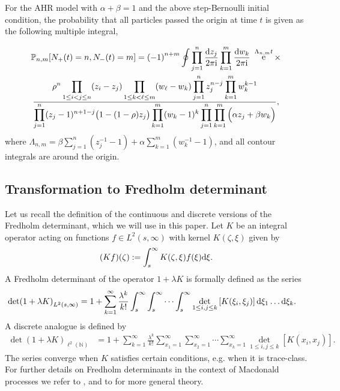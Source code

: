 \documentclass[cmp]{svjour}
\numberwithin{theorem}{section}
\numberwithin{equation}{section}
\DeclareMathOperator{\e}{e}
\def\dd{{\rm d}}
\def\ii{{\rm i}}
\begin{document}
\begin{theorem}
\label{prop:P1rho}
For the AHR model with $\alpha+\beta=1$ and the above step-Bernoulli initial condition, the probability that all particles passed the origin at time $t$ is given as the following multiple integral,

\begin{multline}
 \mathbb{P}_{n,m}[N_+(t)=n, N_-(t)=m] ={(-1)}^{n+m} 
 \oint \prod_{j=1}^n \frac{\dd z_j }{2\pi \ii} \prod_{k=1}^m
\frac{\dd w_k }{2\pi \ii}\ \e^{\Lambda_{n,m} t} \times \\
\frac{\displaystyle \rho^n \prod_{1\le i<j\le n} (z_i-z_j) \prod_{1\le k< \ell \le m} (w_\ell -w_k) \prod_{j=1}^n z_j^{n-j} \prod_{k=1}^m w_k^{k-1}}
{\displaystyle \prod_{j=1}^n (z_j-1)^{n+1-j} \big(1-(1-\rho) z_j\big)
\prod_{k=1}^m (w_k-1)^{k} \prod_{j=1}^n \prod_{k=1}^m \Big(\alpha z_j + \beta w_k\Big)},
\label{Prho1}
\end{multline}
where $\Lambda_{n,m}=\beta \sum_{j=1}^n (z_j^{-1}-1) + \alpha \sum_{k=1}^m (w_k^{-1}-1)$, and all contour integrals are around the origin.
\end{theorem}

\subsection{Transformation to Fredholm determinant}

Let us recall the definition of the continuous and discrete versions of the Fredholm determinant, which we will use in this paper. Let $K$ be an integral operator acting on functions $f \in L^2(s,\infty)$ with kernel $K(\zeta,\xi)$ given by 
$$
(Kf)(\zeta) := \int_{s}^\infty K(\zeta,\xi) f(\xi) \dd \xi.
$$
A Fredholm determinant of the operator $1+\lambda K$ is formally defined as the series 
\begin{align} 
\det(1+\lambda K)_{L^2(s,\infty)} &=  1 + \sum_{k=1}^{\infty}{ \frac{\lambda^k}{k!} } \int_{s}^{\infty}{ \int_{s}^{\infty}{ \cdots \int_{s}^{\infty}{ \det_{1 \leq i , j \leq k}\left[ K(\xi_i, \xi_j) \right] \dd \xi_1 \ldots \dd \xi_k } } }. \label{eq:FHCdef}
\end{align}
A discrete analogue is defined by
\begin{align}
\det(1+\lambda K)_{\ell^2(\mathbb{N})} &= 1 + \sum_{k=1}^{\infty}{\frac{\lambda^k}{k!} } \sum_{x_1 = 1}^{\infty}{ \sum_{x_2 = 1}^{\infty}{ \cdots \sum_{x_k = 1}^{\infty}{ \det_{1 \leq i , j \leq k}\left[ K(x_i, x_j) \right] } } }. \label{eq:FHDdef}
\end{align}
The series converge when $K$ satisfies certain conditions, e.g. when it is trace-class. For further details on Fredholm determinants in the context of Macdonald processes we refer to \cite{BC2014}, and to \cite{lax02,GohbergKrein69} for more general theory.
\end{document}
